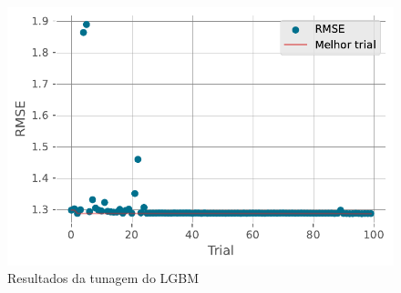 \documentclass[
  12pt,
  a4paper,
]{scrreprt}
\begin{document}
\begin{figure}
\begin{minipage}{0.33\linewidth}
{\captionsetup{labelsep=none}\includegraphics{TCC_files/figure-pdf/fig-lgbm_history-output-1.pdf}

}

\subcaption{\label{fig-lgbm_history}}

\end{minipage}%
\newline
\begin{minipage}{\linewidth}


\subcaption{\label{fig-lgbm_contour}}

\end{minipage}%

\caption{\label{fig-lgbm_param}Resultados da tunagem do LGBM}

\end{figure}%
\end{document}
